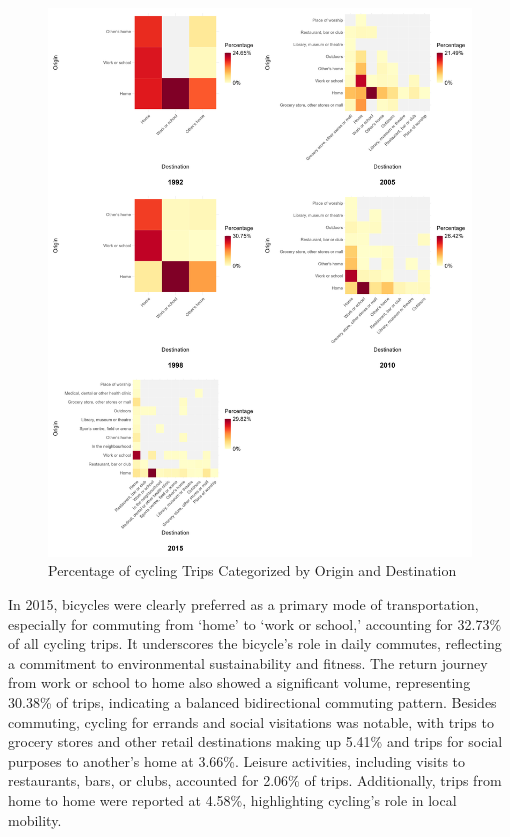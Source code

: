 \documentclass[
11pt, %
oneside, %
english, %
singlespacing, %
]{macthesis} %
\begin{document}
\begin{figure}

{\centering \includegraphics[width=1\linewidth]{figure/ch03_fig_02} 

}

\caption{Percentage of cycling Trips Categorized by Origin and Destination}\label{fig:ch03-plot-fig-02}
\end{figure}

In 2015, bicycles were clearly preferred as a primary mode of transportation, especially for commuting from `home' to `work or school,' accounting for 32.73\% of all cycling trips. It underscores the bicycle's role in daily commutes, reflecting a commitment to environmental sustainability and fitness. The return journey from work or school to home also showed a significant volume, representing 30.38\% of trips, indicating a balanced bidirectional commuting pattern. Besides commuting, cycling for errands and social visitations was notable, with trips to grocery stores and other retail destinations making up 5.41\% and trips for social purposes to another's home at 3.66\%. Leisure activities, including visits to restaurants, bars, or clubs, accounted for 2.06\% of trips. Additionally, trips from home to home were reported at 4.58\%, highlighting cycling's role in local mobility.
\end{document}
